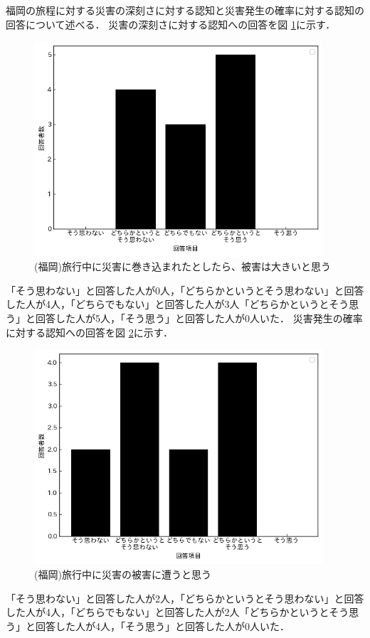 
福岡の旅程に対する災害の深刻さに対する認知と災害発生の確率に対する認知の回答について述べる．
災害の深刻さに対する認知への回答を図 \ref{fig:forecast_fukuoka_1}に示す．
\begin{figure}[H]
  \centering
  \includegraphics[height=8cm]{./fig/forecast_fukuoka_1.png}
  \caption{(福岡)旅行中に災害に巻き込まれたとしたら、被害は大きいと思う}
  \label{fig:forecast_fukuoka_1}
\end{figure}
「そう思わない」と回答した人が0人，「どちらかというとそう思わない」と回答した人が4人，「どちらでもない」と回答した人が3人「どちらかというとそう思う」と回答した人が5人，「そう思う」と回答した人が0人いた．
災害発生の確率に対する認知への回答を図 \ref{fig:forecast_fukuoka_2}に示す．
\begin{figure}[H]
  \centering
  \includegraphics[height=8cm]{./fig/forecast_fukuoka_2.png}
  \caption{(福岡)旅行中に災害の被害に遭うと思う}
  \label{fig:forecast_fukuoka_2}
\end{figure}
「そう思わない」と回答した人が2人，「どちらかというとそう思わない」と回答した人が4人，「どちらでもない」と回答した人が2人「どちらかというとそう思う」と回答した人が4人，「そう思う」と回答した人が0人いた．

